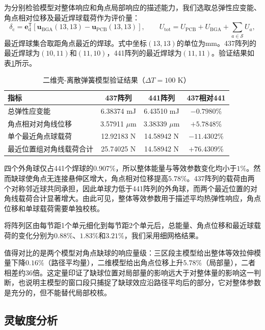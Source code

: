 \documentclass[draft,12pt,a4paper]{ctexart}
\theoremstyle{definition}
\begin{document}
为分别检验模型对整体响应和角点局部响应的描述能力，我们选取总弹性应变能、角点相对位移及最近焊球载荷作为评价量：
\begin{equation}\label{eq:q3-metrics}
\delta_{\mathrm c}
=\mathbf e_{\mathrm d}^{\mathsf T}
\left[\mathbf u_{\mathrm{BGA}}(13,13)
-\mathbf u_{\mathrm{PCB}}(13,13)\right],\qquad
U_{\mathrm{tot}}
=U_{\mathrm{PCB}}+U_{\mathrm{BGA}}+
\sum_{a\in\mathcal S}U_a,
\end{equation}
最近焊球集合取距角点最近的焊球。式中坐标$(13,13)$的单位为mm。437阵列的最近焊球为$(10,11)$和$(11,10)$，441阵列的最近焊球为$(11,11)$。验证结果如表\ref{tab:q3-2d}所示。

\begin{table}[H]\centering
  \caption{二维壳-离散弹簧模型验证结果（$\Delta T=100$ K）}\label{tab:q3-2d}
  \small
  \begin{tabular}{lccc}
    \toprule
    \textbf{指标} & \textbf{437阵列} & \textbf{441阵列} & \textbf{437相对441} \\
    \midrule
    总弹性应变能 & 6.38374 mJ & 6.43510 mJ & $-0.7980\%$ \\
    角点相对对角线位移 & 3.57911 $\mu$m & 3.38339 $\mu$m & $+5.7848\%$ \\
    单个最近角点球载荷 & 12.92183 N & 14.58942 N & $-11.4302\%$ \\
    最近位置组对角线载荷合计 & 25.74025 N & 14.58942 N & $+76.4309\%$ \\
    \bottomrule
  \end{tabular}
\end{table}

四个外角球仅占441个焊球的$0.907\%$，所以整体能量与等效参数变化均小于$1\%$。然而缺球使角点无连接悬伸区增大，角点相对位移提高$5.78\%$。437阵列的载荷由两个对称邻近球共同承担，因此单球力低于441阵列的外角球，而两个最近位置的对角线载荷合计显著增大。由此可见，整体等效参数用于描述平均热弹性响应，角点位移和单球载荷需要单独校核。

将阵列区由每节距1个单元细化到每节距2个单元后，总能量、角点位移和最近球载荷的变化分别为$0.88\%$、$1.83\%$和$3.21\%$，我们采用细网格结果。

值得对比的是两个模型对角点缺球的响应量级：三区段主模型给出整体等效拉伸模量下降$0.16\%$（路径平均量），二维模型给出角点位移上升$5.78\%$（局部量），二者相差约36倍。这定量印证了缺球位置对局部量的影响远大于对整体量的影响这一判断，也说明主模型的窗口段只捕捉了缺球效应沿路径平均后的部分，它对整体参数是充分的，但不能替代局部校核。

\subsection{灵敏度分析}
\end{document}
